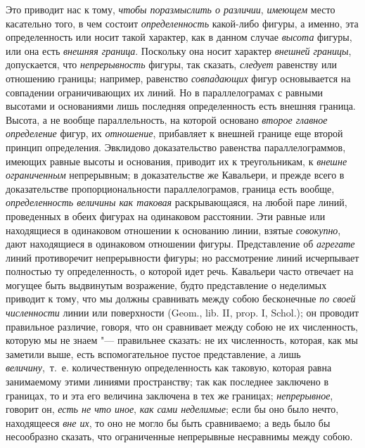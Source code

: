 {Это приводит нас к тому, {\em чтобы поразмыслить о
различии}, {\em имеющем} место касательно того, в чем
состоит {\em определенность} какой-либо фигуры, а
именно, эта определенность или носит такой характер, как в данном случае
{\em высота} фигуры, или она есть
{\em внешняя граница}. Поскольку она носит характер
{\em внешней границы}, допускается, что
{\em непрерывность} фигуры, так сказать,
{\em следует} равенству или отношению границы;
например, равенство {\em совпадающих} фигур
основывается на совпадении ограничивающих их линий. Но в параллелограмах с
равными высотами и основаниями лишь последняя определенность есть внешняя
граница. Высота, а не вообще параллельность, на которой основано
{\em второе главное определение} фигур, их
{\em отношение}, прибавляет к внешней границе еще
второй принцип определения. Эвклидово доказательство равенства
параллелограммов, имеющих равные высоты и основания, приводит их к
треугольникам, к {\em внешне ограниченным} непрерывным;
в доказательстве же Кавальери, и прежде всего в доказательстве
пропорциональности параллелограмов, граница есть вообще,
{\em определенность величины как таковая}
раскрывающаяся, на любой паре линий, проведенных в обеих фигурах на
одинаковом расстоянии. Эти равные или находящиеся в одинаковом отношении к
основанию линии, взятые {\em совокупно}, дают
находящиеся в одинаковом отношении фигуры. Представление об
{\em агрегате} линий противоречит непрерывности фигуры;
но рассмотрение линий исчерпывает полностью ту определенность, о которой
идет речь. Кавальери часто отвечает на могущее быть выдвинутым возражение,
будто представление о неделимых приводит к тому, что мы должны сравнивать
между собою бесконечные {\em по своей численности}
линии или поверхности (Geom., lib. II, prop. I, Schol.); он проводит
правильное различие, говоря, что он сравнивает между собою не их
численность, которую мы не знаем "--- правильнее сказать: не их численность,
которая, как мы заметили выше, есть вспомогательное пустое представление, а
лишь {\em величину},~т.~е. количественную
определенность как таковую, которая равна занимаемому этими линиями
пространству; так как последнее заключено в границах, то и эта его величина
заключена в тех же границах; {\em непрерывное}, говорит
он, {\em есть не что иное},{\em 
как сами неделимые}; если бы оно было нечто, находящееся
{\em вне их}, то оно не могло бы быть сравниваемо; а
ведь было бы несообразно сказать, что ограниченные непрерывные несравнимы
между собою.

}
